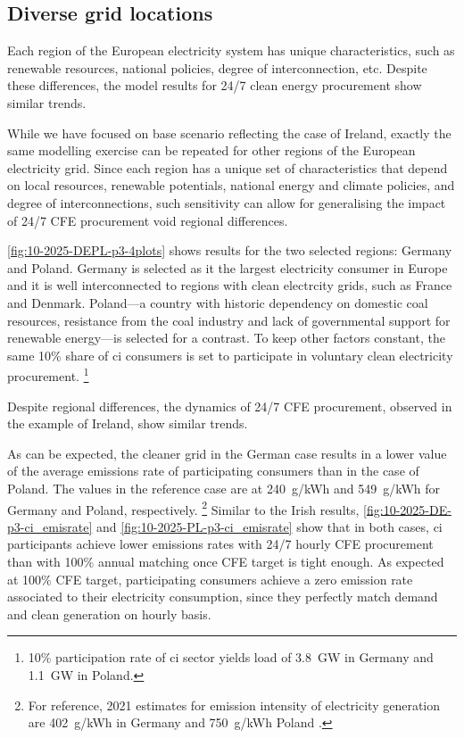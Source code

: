 \subsection{Diverse grid locations}
\label{subsec:location}

\vspace{10pt}
\begin{res}
    Each region of the European electricity system has unique characteristics, such as renewable resources, national policies, degree of interconnection, etc.
    Despite these differences, the model results for 24/7 clean energy procurement show similar trends. 
\end{res}

While we have focused on base scenario reflecting the case of Ireland, exactly the same modelling exercise can be repeated for other regions of the European electricity grid.
Since each region has a unique set of characteristics that depend on local resources, renewable potentials, national energy and climate policies, and degree of interconnections, such sensitivity can allow for generalising the impact of 24/7 CFE procurement void regional differences.

\cref{fig:10-2025-DEPL-p3-4plots} shows results for the two selected regions: Germany and Poland. Germany is selected as it the largest electricity consumer in Europe and it is well interconnected to regions with clean electrcity grids, such as France and Denmark. 
Poland—a country with  historic dependency on domestic coal resources, resistance from the coal industry and lack of governmental support for renewable energy—is selected for a contrast. To keep other factors constant, the same 10\% share of \gls{ci} consumers is set to participate in voluntary clean electricity procurement.%
\footnote{10\% participation rate of \gls{ci} sector yields load of 3.8~GW in Germany and 1.1~GW in Poland.}

Despite regional differences, the dynamics of 24/7 CFE procurement, observed in the example of Ireland, show similar trends. 

As can be expected, the cleaner grid in the German case results in a lower value of the average emissions rate of participating consumers than in the case of Poland. 
The values in the reference case are at 240~g\co/kWh and 549~g\co/kWh for Germany and Poland, respectively.%
\footnote{For reference, 2021 estimates for emission intensity of electricity generation are 402~g\co/kWh in Germany and 750~g\co/kWh Poland \cite{EEA-europa-web}.}
Similar to the Irish results, \cref{fig:10-2025-DE-p3-ci_emisrate} and \cref{fig:10-2025-PL-p3-ci_emisrate} show that in both cases, \gls{ci} participants achieve lower emissions rates with 24/7 hourly CFE procurement than with 100\% annual matching once CFE target is tight enough. 
As expected at 100\% CFE target, participating consumers achieve a zero emission rate associated to their electricity consumption, since they perfectly match demand and clean generation on hourly basis.

